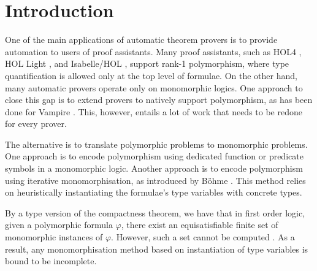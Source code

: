 \documentclass[]{ceurart}
\begin{document}
\section{Introduction}

One of the main applications of automatic theorem provers is to provide automation to users of proof assistants. Many proof assistants, such as HOL4 \cite{slind-norrish-2008}, HOL Light \cite{harrison-2009}, and
Isabelle/HOL \cite{nipkow-et-al-2002}, support rank-1 polymorphism, where type quantification is allowed only at the top level of formulae. On the other hand, many automatic provers operate only on monomorphic logics. One approach to close this gap is to extend provers to natively support polymorphism, as has been done for Vampire \cite{bhayat-reger-2020}. This, however, entails a lot of work that needs to be redone for every prover.


The alternative is to translate polymorphic problems to monomorphic problems. One approach is to encode polymorphism using dedicated function or predicate symbols \cite{mono-trans} in a monomorphic logic. Another approach is to encode polymorphism using {iterative monomorphisation}, as introduced by B\"ohme \cite[Section 2.2.1]{sb-phd}. This method relies on heuristically instantiating the formulae's type variables with concrete types.


By a type version of the compactness theorem, we have that in first order logic, given a polymorphic formula \(\varphi\), there exist an equisatisfiable finite set of monomorphic instances of \(\varphi\). However, such a set cannot be computed \cite[Theorem 1]{expr-poly-types}. As a result, any monomorphisation method based on instantiation of type variables is
bound to be incomplete.
\end{document}
